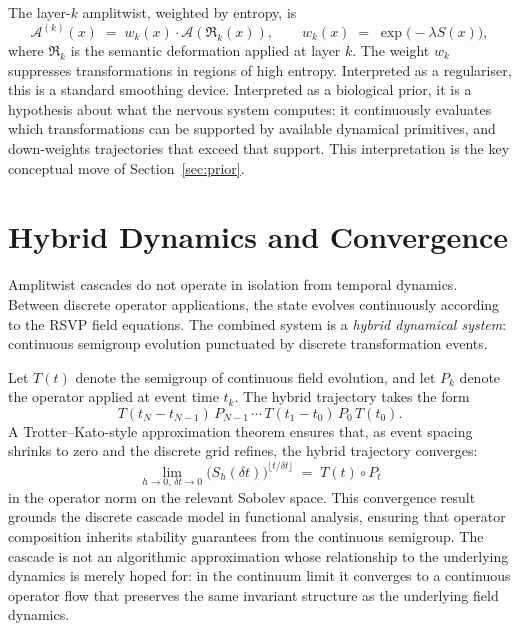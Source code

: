 \documentclass[12pt, a4paper]{article}
\theoremstyle{remark}
\theoremstyle{definition}
\newcommand{\A}{\mathcal{A}}
\newcommand{\Rk}{\mathfrak{R}}
\begin{document}
The layer-$k$ amplitwist, weighted by entropy, is
\begin{equation}
  \A^{(k)}(x) \;=\; w_k(x)\cdot \A\!\left(\Rk_k(x)\right), \qquad
  w_k(x) \;=\; \exp\!\bigl(-\lambda S(x)\bigr),
  \label{eq:weighted}
\end{equation}
where $\Rk_k$ is the semantic deformation applied at layer $k$.  The weight $w_k$
suppresses transformations in regions of high entropy.  Interpreted as a regulariser, this
is a standard smoothing device.  Interpreted as a biological prior, it is a hypothesis
about what the nervous system computes: it continuously evaluates which transformations can
be supported by available dynamical primitives, and down-weights trajectories that exceed
that support.  This interpretation is the key conceptual move of Section~\ref{sec:prior}.

\section{Hybrid Dynamics and Convergence}
\label{sec:hybrid}

Amplitwist cascades do not operate in isolation from temporal dynamics.  Between discrete
operator applications, the state evolves continuously according to the RSVP field
equations.  The combined system is a \emph{hybrid dynamical system}: continuous semigroup
evolution punctuated by discrete transformation events.

Let $T(t)$ denote the semigroup of continuous field evolution, and let $P_k$ denote the
operator applied at event time $t_k$.  The hybrid trajectory takes the form
\begin{equation}
  T(t_N - t_{N-1})\, P_{N-1}\, \cdots\, T(t_1 - t_0)\, P_0\, T(t_0).
  \label{eq:hybrid}
\end{equation}
A Trotter--Kato-style approximation theorem ensures that, as event spacing shrinks to zero
and the discrete grid refines, the hybrid trajectory converges:
\begin{equation}
  \lim_{h \to 0,\, \delta t \to 0}
  \bigl(S_h(\delta t)\bigr)^{\lfloor t/\delta t\rfloor}
  \;=\; T(t) \circ P_t
  \label{eq:trotterkato}
\end{equation}
in the operator norm on the relevant Sobolev space.  This convergence result grounds the
discrete cascade model in functional analysis, ensuring that operator composition inherits
stability guarantees from the continuous semigroup.  The cascade is not an algorithmic
approximation whose relationship to the underlying dynamics is merely hoped for: in the
continuum limit it converges to a continuous operator flow that preserves the same
invariant structure as the underlying field dynamics.
\end{document}

